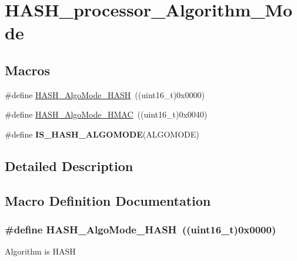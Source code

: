 \hypertarget{group___h_a_s_h__processor___algorithm___mode}{}\section{H\+A\+S\+H\+\_\+processor\+\_\+\+Algorithm\+\_\+\+Mode}
\label{group___h_a_s_h__processor___algorithm___mode}
\subsection*{Macros}
\begin{DoxyCompactItemize}
\item 
\#define \hyperlink{group___h_a_s_h__processor___algorithm___mode_ga4de18ef48bad8fe403226abe769bd921}{H\+A\+S\+H\+\_\+\+Algo\+Mode\+\_\+\+H\+A\+S\+H}~((uint16\+\_\+t)0x0000)
\item 
\#define \hyperlink{group___h_a_s_h__processor___algorithm___mode_ga70224c1ea0eef2f45363f92fc001a875}{H\+A\+S\+H\+\_\+\+Algo\+Mode\+\_\+\+H\+M\+A\+C}~((uint16\+\_\+t)0x0040)
\item 
\#define {\bfseries I\+S\+\_\+\+H\+A\+S\+H\+\_\+\+A\+L\+G\+O\+M\+O\+D\+E}(A\+L\+G\+O\+M\+O\+D\+E)
\end{DoxyCompactItemize}


\subsection{Detailed Description}


\subsection{Macro Definition Documentation}
\hypertarget{group___h_a_s_h__processor___algorithm___mode_ga4de18ef48bad8fe403226abe769bd921}{}
\subsubsection[{H\+A\+S\+H\+\_\+\+Algo\+Mode\+\_\+\+H\+A\+S\+H}]{\setlength{\rightskip}{0pt plus 5cm}\#define H\+A\+S\+H\+\_\+\+Algo\+Mode\+\_\+\+H\+A\+S\+H~((uint16\+\_\+t)0x0000)}\label{group___h_a_s_h__processor___algorithm___mode_ga4de18ef48bad8fe403226abe769bd921}
Algorithm is H\+A\+S\+H \hypertarget{group___h_a_s_h__processor___algorithm___mode_ga70224c1ea0eef2f45363f92fc001a875}{}
